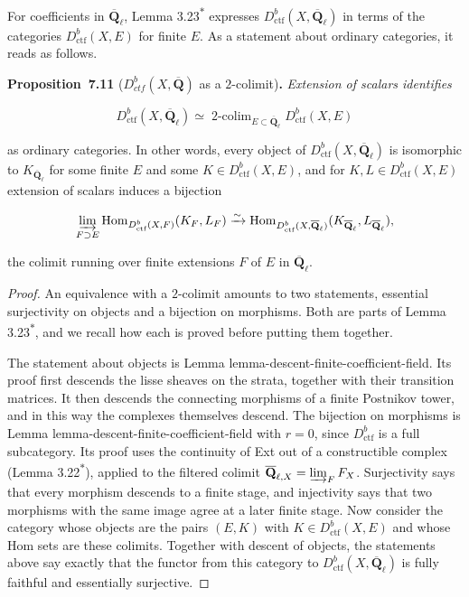 \documentclass[11pt]{article}
\newenvironment{bpstatement}[2]{\par\addvspace{0.6\baselineskip}\noindent\textbf{#1}#2\textbf{.}\enspace\ignorespaces}
  {\par\addvspace{0.4\baselineskip}}
\newenvironment{bpstatementit}[2]{\begin{bpstatement}{#1}{#2}\itshape\ignorespaces}{\end{bpstatement}}
\newcommand{\bpout}[1]{#1\textsuperscript{\hyperlink{bp-outside}{\ensuremath{\ast}}}}
\providecommand{\Dctf}{}\renewcommand{\Dctf}{D^b_{ctf}}
\providecommand{\Hom}{}\renewcommand{\Hom}{\operatorname{Hom}}
\providecommand{\Qbar}{}\renewcommand{\Qbar}{\overline{\mathbf Q}}
\providecommand{\QbarX}{}\renewcommand{\QbarX}{\overline{\mathbf Q}_{\ell,X}}
\begin{document}
For coefficients in \(\overline{\mathbf Q}_\ell\), Lemma \bpout{3.23} expresses \(D^b_{\mathrm{ctf}}(X,\overline{\mathbf Q}_\ell)\) in terms of the categories \(D^b_{\mathrm{ctf}}(X,E)\) for finite \(E\). As a statement about ordinary categories, it reads as follows.

\label{bp29}%
\begin{bpstatementit}{Proposition~7.11}{ ($\Dctf(X,\Qbar)$ as a $2$-colimit)}
Extension of scalars identifies

\[
D^b_{\mathrm{ctf}}(X,\overline{\mathbf Q}_\ell)\simeq\mathop{\text{2-colim}}_{E\subset\overline{\mathbf Q}_\ell}D^b_{\mathrm{ctf}}(X,E)
\]

as ordinary categories. In other words, every object of \(D^b_{\mathrm{ctf}}(X,\overline{\mathbf Q}_\ell)\) is isomorphic to \(K_{\overline{\mathbf Q}_\ell}\) for some finite \(E\) and some \(K\in D^b_{\mathrm{ctf}}(X,E)\), and for \(K,L\in D^b_{\mathrm{ctf}}(X,E)\) extension of scalars induces a bijection

\[
\varinjlim_{F\supset E}\Hom_{D^b_{\mathrm{ctf}}(X,F)}(K_F,L_F)
\xrightarrow{\sim}\Hom_{D^b_{\mathrm{ctf}}(X,\overline{\mathbf Q}_\ell)}(K_{\overline{\mathbf Q}_\ell},L_{\overline{\mathbf Q}_\ell}),
\]

the colimit running over finite extensions \(F\) of \(E\) in \(\overline{\mathbf Q}_\ell\).
\end{bpstatementit}

\begin{proof}[{Proof}]\label{bp30}%
An equivalence with a \(2\)-colimit amounts to two statements, essential surjectivity on objects and a bijection on morphisms. Both are parts of Lemma \bpout{3.23}, and we recall how each is proved before putting them together.

The statement about objects is Lemma lemma-descent-finite-coefficient-field. Its proof first descends the lisse sheaves on the strata, together with their transition matrices. It then descends the connecting morphisms of a finite Postnikov tower, and in this way the complexes themselves descend. The bijection on morphisms is Lemma lemma-descent-finite-coefficient-field with \(r=0\), since \(D^b_{\mathrm{ctf}}\) is a full subcategory. Its proof uses the continuity of Ext out of a constructible complex (Lemma \bpout{3.22}), applied to the filtered colimit \(\QbarX=\varinjlim_F F_X\). Surjectivity says that every morphism descends to a finite stage, and injectivity says that two morphisms with the same image agree at a later finite stage. Now consider the category whose objects are the pairs \((E,K)\) with \(K\in D^b_{\mathrm{ctf}}(X,E)\) and whose Hom sets are these colimits. Together with descent of objects, the statements above say exactly that the functor from this category to \(D^b_{\mathrm{ctf}}(X,\overline{\mathbf Q}_\ell)\) is fully faithful and essentially surjective.
\end{proof}
\end{document}
